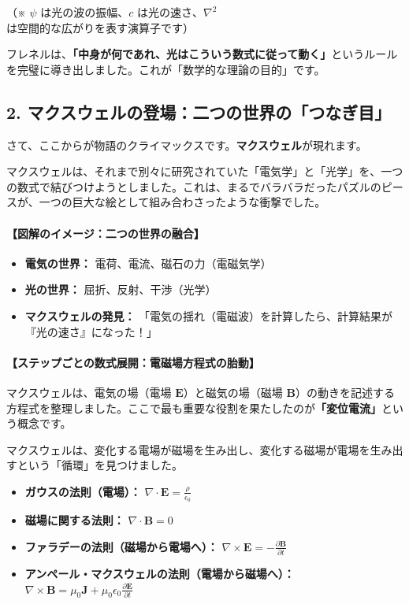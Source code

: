 \documentclass[a4paper,11pt,openany]{ltjsbook}
\begin{document}
\begin{lecturebox}
（※ $\psi$ は光の波の振幅、$c$ は光の速さ、$\nabla^2$ は空間的な広がりを表す演算子です）

フレネルは、\textbf{「中身が何であれ、光はこういう数式に従って動く」}というルールを完璧に導き出しました。これが「数学的な理論の目的」です。

\subsection*{2. マクスウェルの登場：二つの世界の「つなぎ目」}

さて、ここからが物語のクライマックスです。\textbf{マクスウェル}が現れます。

マクスウェルは、それまで別々に研究されていた「電気学」と「光学」を、一つの数式で結びつけようとしました。これは、まるでバラバラだったパズルのピースが、一つの巨大な絵として組み合わさったような衝撃でした。

\paragraph{【図解のイメージ：二つの世界の融合】}
\begin{itemize}[leftmargin=2em]
\item \textbf{電気の世界：} 電荷、電流、磁石の力（電磁気学）
\item \textbf{光の世界：} 屈折、反射、干渉（光学）
\item \textbf{マクスウェルの発見：} 「電気の揺れ（電磁波）を計算したら、計算結果が『光の速さ』になった！」
\end{itemize}

\paragraph{【ステップごとの数式展開：電磁場方程式の胎動】}
マクスウェルは、電気の場（電場 $\mathbf{E}$）と磁気の場（磁場 $\mathbf{B}$）の動きを記述する方程式を整理しました。ここで最も重要な役割を果たしたのが\textbf{「変位電流」}という概念です。

マクスウェルは、変化する電場が磁場を生み出し、変化する磁場が電場を生み出すという「循環」を見つけました。

\begin{itemize}[leftmargin=2em]
\item \textbf{ガウスの法則（電場）：} $\nabla \cdot \mathbf{E} = \frac{\rho}{\epsilon_0}$
\item \textbf{磁場に関する法則：} $\nabla \cdot \mathbf{B} = 0$
\item \textbf{ファラデーの法則（磁場から電場へ）：} $\nabla \times \mathbf{E} = -\frac{\partial \mathbf{B}}{\partial t}$
\item \textbf{アンペール・マクスウェルの法則（電場から磁場へ）：} $\nabla \times \mathbf{B} = \mu_0 \mathbf{J} + \mu_0 \epsilon_0 \frac{\partial \mathbf{E}}{\partial t}$
\end{itemize}


\end{lecturebox}
\end{document}

